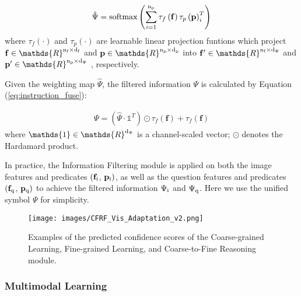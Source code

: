 \documentclass[10pt,twocolumn,letterpaper]{article}
\newcommand{\softmax}{\mathrm{softmax}}
\begin{document}
\begin{equation}
\begin{aligned}
\hat{\Psi}= \softmax\left(\sum^{\rm n_p}_{i=1} \tau _f\left(\mathbf{f}\right) \tau _p\left(\mathbf{p}\right)^T_i\right)
\end{aligned}
\label{eq:instruction_gain}
\end{equation}
where $\tau _f(\cdotp)$ and $\tau _p(\cdotp)$ are learnable linear projection funtions which project $\mathbf{f} \in \mathds{R}^{\rm n_f \times \rm d_f}$ and $\mathbf{p} \in \mathds{R}^{\rm n_p \times \rm d_p}$  into  $\mathbf{f}\sp{\prime} \in \mathds{R}^{\rm n_f \times \rm d_{\Psi}}$  and $\mathbf{p}\sp{\prime} \in \mathds{R}^{\rm n_p \times \rm d_{\Psi}}$ , respectively. 


Given the weighting map $\hat{\Psi}$, the filtered information $\Psi$ is calculated by Equation (\ref{eq:instruction_fuse}):

\begin{equation}
\begin{aligned}
\Psi  = \left(\hat{\Psi}\cdot\mathds{1}^T\right) \odot \tau_f\left(\mathbf{f}\right) + \tau_f\left(\mathbf{f}\right)
\end{aligned}
\label{eq:instruction_fuse}
\end{equation}
where $\mathds{1} \in \mathds{R}^{\rm d_{\Psi}}$ is a channel-scaled vector; $\odot$ denotes the Hardamard product.


In practice, the Information Filtering module is applied on both the image features and predicates $(\mathbf{f}_{\rm i}$,  $\mathbf{p}_{\rm i})$, as well as the question features and predicates $(\mathbf{f}_{\rm q}$,  $\mathbf{p}_{\rm q})$ to achieve the filtered information $\Psi_{\rm i}$ and $\Psi_{\rm q}$. Here we use the unified symbol $\Psi$ for simplicity.



\begin{figure*}[!ht]
    \centering
    \texttt{[image: images/CFRF\_Vis\_Adaptation\_v2.png]}
    \caption{Examples of the predicted confidence scores of the
    Coarse-grained Learning, Fine-grained Learning, and Coarse-to-Fine Reasoning module.}
    \label{fig:sample_Adaptation}
\end{figure*}
\subsubsection{Multimodal Learning}
\label{subsec_multi_integration}
\end{document}
